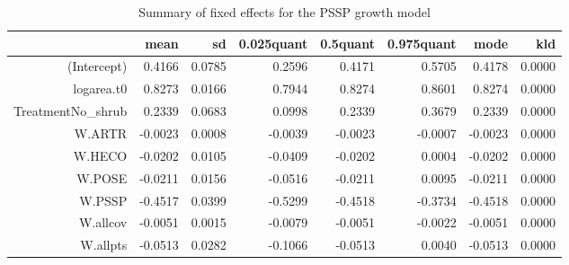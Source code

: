 \begin{table}[ht]
\centering
\caption{Summary of fixed effects for the PSSP growth model} 
\label{PSSPgrowth}
\begin{tabular}{rrrrrrrr}
  \hline
 & mean & sd & 0.025quant & 0.5quant & 0.975quant & mode & kld \\ 
  \hline
(Intercept) & 0.4166 & 0.0785 & 0.2596 & 0.4171 & 0.5705 & 0.4178 & 0.0000 \\ 
  logarea.t0 & 0.8273 & 0.0166 & 0.7944 & 0.8274 & 0.8601 & 0.8274 & 0.0000 \\ 
  TreatmentNo\_shrub & 0.2339 & 0.0683 & 0.0998 & 0.2339 & 0.3679 & 0.2339 & 0.0000 \\ 
  W.ARTR & -0.0023 & 0.0008 & -0.0039 & -0.0023 & -0.0007 & -0.0023 & 0.0000 \\ 
  W.HECO & -0.0202 & 0.0105 & -0.0409 & -0.0202 & 0.0004 & -0.0202 & 0.0000 \\ 
  W.POSE & -0.0211 & 0.0156 & -0.0516 & -0.0211 & 0.0095 & -0.0211 & 0.0000 \\ 
  W.PSSP & -0.4517 & 0.0399 & -0.5299 & -0.4518 & -0.3734 & -0.4518 & 0.0000 \\ 
  W.allcov & -0.0051 & 0.0015 & -0.0079 & -0.0051 & -0.0022 & -0.0051 & 0.0000 \\ 
  W.allpts & -0.0513 & 0.0282 & -0.1066 & -0.0513 & 0.0040 & -0.0513 & 0.0000 \\ 
   \hline
\end{tabular}
\end{table}
